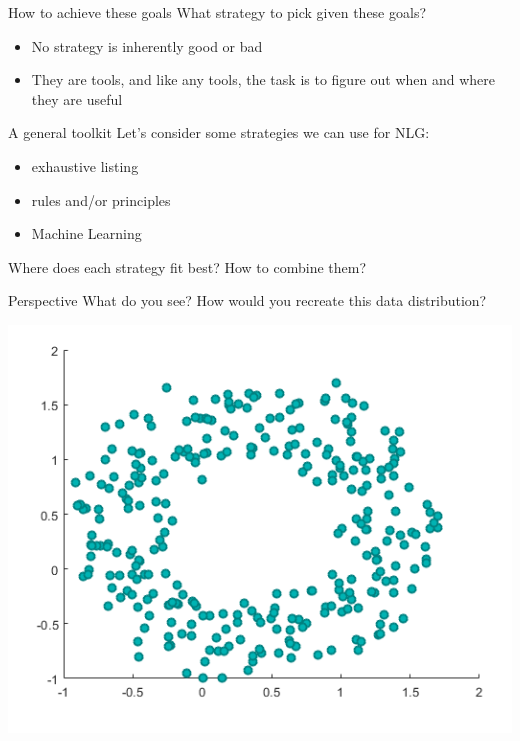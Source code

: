 \documentclass[10pt, compress]{beamer}
\begin{document}
\begin{frame}{How to achieve these goals}
	What strategy to pick given these goals? \pause
    \begin{itemize}
		\item No strategy is inherently good or bad \pause
		\item They are tools, and like any tools, the task is to figure out when and where they are useful
	\end{itemize}
\end{frame}

\begin{frame}{A general toolkit}
	Let's consider some strategies we can use for NLG: \pause

	\begin{itemize}
		\item exhaustive listing \pause
		\item rules and/or principles \pause
		\item Machine Learning \pause
	\end{itemize}

	\pause

	Where does each strategy fit best? How to combine them?
\end{frame}

\begin{frame}{Perspective}
	What do you see? How would you recreate this data distribution?
	\begin{center}
		\includegraphics[width=.8\textwidth]{images/circleplot.png}
	\end{center}
\end{frame}
\end{document}
